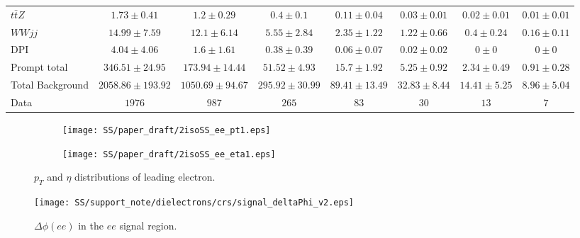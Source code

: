 \begin{table*}[htbp]
\begin{center}
{\begin{tabular}{l|c|c|c|c|c|c|c}
$t\bar{t}Z$	& $ 1.73 \pm 0.41 $	& $ 1.2 \pm 0.29 $	& $ 0.4 \pm 0.1 $	& $ 0.11 \pm 0.04 $	& $ 0.03 \pm 0.01 $	& $ 0.02 \pm 0.01 $	& $ 0.01 \pm 0.01 $	\\[+0.05in]
$WWjj$	& $ 14.99 \pm 7.59 $	& $ 12.1 \pm 6.14 $	& $ 5.55 \pm 2.84 $	& $ 2.35 \pm 1.22 $	& $ 1.22 \pm 0.66 $	& $ 0.4 \pm 0.24 $	& $ 0.16 \pm 0.11 $	\\[+0.05in]
DPI	& $ 4.04 \pm 4.06 $	& $ 1.6 \pm 1.61 $	& $ 0.38 \pm 0.39 $	& $ 0.06 \pm 0.07 $	& $ 0.02 \pm 0.02 $	& $ 0 \pm 0 $	& $ 0 \pm 0 $	\\[+0.05in]
\hline
Prompt total	& $ 346.51 \pm 24.95 $	& $ 173.94 \pm 14.44 $	& $ 51.52 \pm 4.93 $	& $ 15.7 \pm 1.92 $	& $ 5.25 \pm 0.92 $	& $ 2.34 \pm 0.49 $	& $ 0.91 \pm 0.28 $	\\[+0.05in]
\hline\hline
Total Background	& $ 2058.86 \pm 193.92 $	& $ 1050.69 \pm 94.67 $	& $ 295.92 \pm 30.99 $	& $ 89.41 \pm 13.49 $	& $ 32.83 \pm 8.44 $	& $ 14.41 \pm 5.25 $	& $ 8.96 \pm 5.04 $	\\[+0.05in]
\hline\hline
Data	& $ 1976 $	& $ 987 $	& $ 265 $	& $ 83 $	& $ 30 $	& $ 13 $	& $ 7 $	\\[+0.05in]

\hline
\end{tabular}
}
\end{center}
\label{tab:2iso_ee_SS}
\end{table*}


\begin{figure}
\begin{subfigure}{.5\textwidth}
  \centering
  \texttt{[image: SS/paper\_draft/2isoSS\_ee\_pt1.eps]}
\end{subfigure}%
\begin{subfigure}{.5\textwidth}
  \centering
  \texttt{[image: SS/paper\_draft/2isoSS\_ee\_eta1.eps]}
\end{subfigure}
\caption{\toDo $p_T$ and $\eta$ distributions of leading electron.}
  \label{fig:signal_kinematics}
\end{figure}

\begin{figure}[h]
\begin{center}
\texttt{[image: SS/support\_note/dielectrons/crs/signal\_deltaPhi\_v2.eps]}
\caption{\toDo $\Delta\phi(ee)$ in the $ee$ signal region.}
\label{fig:delta_phi}
\end{center}
\end{figure}




